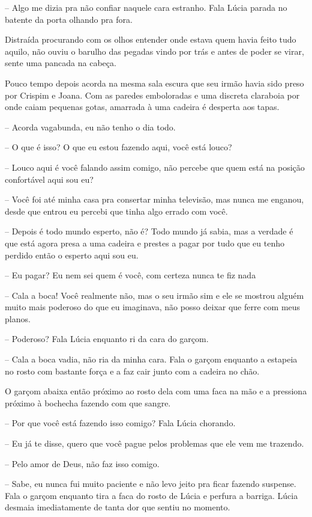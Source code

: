 -- Algo me dizia pra não confiar naquele cara estranho. Fala Lúcia parada no batente da porta olhando pra fora.

Distraída procurando com os olhos entender onde estava quem havia feito tudo aquilo, não ouviu o barulho das pegadas vindo por trás e antes de poder se virar, sente uma pancada na cabeça.

Pouco tempo depois acorda na mesma sala escura que seu irmão havia sido preso por Crispim e Joana. Com as paredes emboloradas e uma discreta claraboia por onde caiam pequenas gotas, amarrada à uma cadeira é desperta aos tapas.

-- Acorda vagabunda, eu não tenho o dia todo.

-- O que é isso? O que eu estou fazendo aqui, você está louco?

-- Louco aqui é você falando assim comigo, não percebe que quem está na posição confortável aqui sou eu?

-- Você foi até minha casa pra consertar minha televisão, mas nunca me enganou, desde que entrou eu percebi que tinha algo errado com você.

-- Depois é todo mundo esperto, não é? Todo mundo já sabia, mas a verdade é que está agora presa a uma cadeira e prestes a pagar por tudo que eu tenho perdido então o esperto aqui sou eu.

-- Eu pagar? Eu nem sei quem é você, com certeza nunca te fiz nada

-- Cala a boca! Você realmente não, mas o seu irmão sim e ele se mostrou alguém muito mais poderoso do que eu imaginava, não posso deixar que ferre com meus planos.

-- Poderoso? Fala Lúcia enquanto ri da cara do garçom.

-- Cala a boca vadia, não ria da minha cara. Fala o garçom enquanto a estapeia no rosto com bastante força e a faz cair junto com a cadeira no chão.

O garçom abaixa então próximo ao rosto dela com uma faca na mão e a pressiona próximo à bochecha fazendo com que sangre.

-- Por que você está fazendo isso comigo? Fala Lúcia chorando.

-- Eu já te disse, quero que você pague pelos problemas que ele vem me trazendo.

-- Pelo amor de Deus, não faz isso comigo.

-- Sabe, eu nunca fui muito paciente e não levo jeito pra ficar fazendo suspense. Fala o garçom enquanto tira a faca do rosto de Lúcia e perfura a barriga. Lúcia desmaia imediatamente de tanta dor que sentiu no momento.

